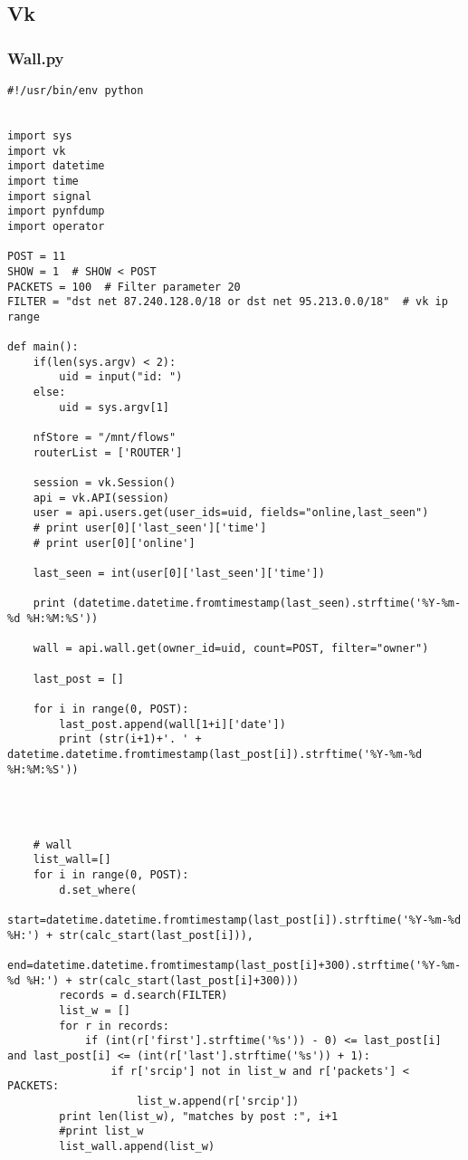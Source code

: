 
\subsection{Vk}

\subsubsection{Wall.py}

\begin{lstlisting}
#!/usr/bin/env python


import sys
import vk
import datetime
import time
import signal
import pynfdump
import operator

POST = 11
SHOW = 1  # SHOW < POST
PACKETS = 100  # Filter parameter 20
FILTER = "dst net 87.240.128.0/18 or dst net 95.213.0.0/18"  # vk ip range

def main():
    if(len(sys.argv) < 2):
        uid = input("id: ")
    else:
        uid = sys.argv[1]

    nfStore = "/mnt/flows"
    routerList = ['ROUTER']

    session = vk.Session()
    api = vk.API(session)
    user = api.users.get(user_ids=uid, fields="online,last_seen")
    # print user[0]['last_seen']['time']
    # print user[0]['online']

    last_seen = int(user[0]['last_seen']['time'])

    print (datetime.datetime.fromtimestamp(last_seen).strftime('%Y-%m-%d %H:%M:%S'))

    wall = api.wall.get(owner_id=uid, count=POST, filter="owner")

    last_post = []

    for i in range(0, POST):
        last_post.append(wall[1+i]['date'])
        print (str(i+1)+'. ' + datetime.datetime.fromtimestamp(last_post[i]).strftime('%Y-%m-%d %H:%M:%S'))




    # wall
    list_wall=[]
    for i in range(0, POST):
        d.set_where(
            start=datetime.datetime.fromtimestamp(last_post[i]).strftime('%Y-%m-%d %H:') + str(calc_start(last_post[i])),
            end=datetime.datetime.fromtimestamp(last_post[i]+300).strftime('%Y-%m-%d %H:') + str(calc_start(last_post[i]+300)))
        records = d.search(FILTER)
        list_w = []
        for r in records:
            if (int(r['first'].strftime('%s')) - 0) <= last_post[i] and last_post[i] <= (int(r['last'].strftime('%s')) + 1):
                if r['srcip'] not in list_w and r['packets'] < PACKETS:
                    list_w.append(r['srcip'])
        print len(list_w), "matches by post :", i+1
        #print list_w
        list_wall.append(list_w)



\end{lstlisting}
